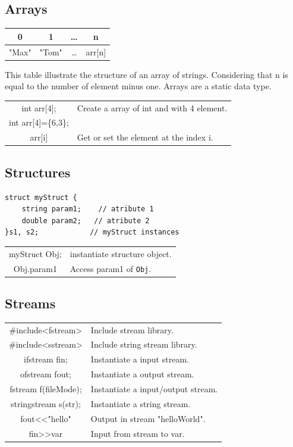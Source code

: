 \documentclass[5pt]{article}
\begin{document}
\begin{multicols}{2}
\subsection{Arrays}
\begin{tabular}{c|c|c|c }
 0 & 1 & … & n \\ 
 \hline
 "Max" & "Tom" & … & arr$[$n$]$
\end{tabular}
This table illustrate the structure of an array of strings. Considering that n is equal to the number of element minus one. Arrays are a static data type.\\[6pt]
\begin{tabular}{C L}
int arr[4];         & Create a array of int and with 4 element.\\
int arr[4]=\{6,3\}; & \\
arr$[$i$]$          & Get or set the element at the index i.\\
\end{tabular}


\subsection{Structures}
\begin{verbatim}
struct myStruct {
    string param1;    // atribute 1
    double param2;   // atribute 2
}s1, s2;            // myStruct instances
\end{verbatim}
\begin{tabular}{C L}
myStruct Obj;   & instantiate structure object. \\
Obj.param1      & Access param1 of \texttt{Obj}. \\
\end{tabular}


\subsection{Streams}
\begin{tabular}{C L}

\#include<fstream>      & Include stream library. \\
\#include<sstream>      & Include string stream library. \\
ifstream fin;           & Instantiate a input stream. \\
ofstream fout;          & Instantiate a output stream. \\
fstream f(fileMode);    & Instantiate a input/output stream. \\
stringstream s(str);    & Instantiate a string stream. \\
fout<<"hello"           & Output in stream "helloWorld". \\
fin>>var                & Input from stream to var. \\
\end{tabular}


\end{multicols}
\end{document}
